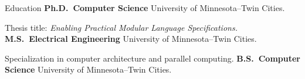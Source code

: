 \begin{rubric}{Education}
%
	\textbf{Ph.D.~Computer Science} University of Minnesota--Twin Cities.
	\par Thesis title: \emph{Enabling Practical Modular Language Specifications.}
% 
\entry*[2016 -- 2018]%
	\textbf{M.S.~Electrical Engineering} University of Minnesota--Twin Cities.
	\par Specialization in computer architecture and parallel computing.
%
\entry*[2011 -- 2015]%
	\textbf{B.S.~Computer Science} University of Minnesota--Twin Cities.
\end{rubric}